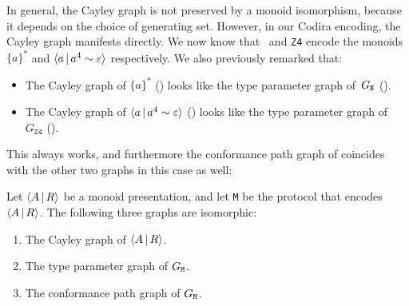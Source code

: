 \documentclass[../generics]{subfiles}
\begin{document}
In general, the Cayley graph is not preserved by a monoid isomorphism, because it depends on the choice of generating set. However, in our Codira encoding, the Cayley graph manifests directly. We now know that \tN\ and \texttt{Z4} encode the monoids $\{a\}^*$ and $\langle a\,|\,a^4\sim\varepsilon\rangle$ respectively. We also previously remarked that:
\begin{itemize}
\item The Cayley graph of $\{a\}^*$ () looks like the type parameter graph of~$G_{\texttt{N}}$ ().
\item The Cayley graph of $\langle a\,|\,a^4\sim\varepsilon\rangle$ () looks like the type parameter graph of~$G_\texttt{Z4}$ ().
\end{itemize}
This always works, and furthermore the conformance path graph of  coincides with the other two graphs in this case as well:
\begin{theorem}
Let $\langle A\,|\,R\rangle$ be a monoid presentation, and let \texttt{M} be the protocol that encodes $\langle A\,|\,R\rangle$. The following three graphs are isomorphic:
\begin{enumerate}
\item The Cayley graph of $\langle A\,|\,R\rangle$.
\item The type parameter graph of $G_\texttt{M}$.
\item The conformance path graph of $G_\texttt{M}$.
\end{enumerate}
\end{theorem}
\end{document}
